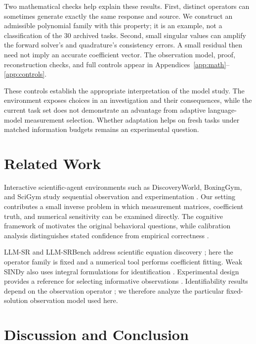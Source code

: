 \documentclass{article}
\begin{document}
Two mathematical checks help explain these results. First, distinct operators
can sometimes generate exactly the same response and source. We construct an
admissible polynomial family with this property; it is an example, not a
classification of the 30 archived tasks. Second, small singular values can
amplify the forward solver's and quadrature's consistency errors. A small
residual then need not imply an accurate coefficient vector. The observation
model, proof, reconstruction checks, and full controls appear in
Appendices~\ref{app:math}--\ref{app:controls}.

These controls establish the appropriate interpretation of the model study.
The environment exposes choices in an investigation and their consequences,
while the current task set does not demonstrate an advantage from adaptive
language-model measurement selection. Whether adaptation helps on fresh tasks
under matched information budgets remains an experimental question.

\section{Related Work}

Interactive scientific-agent environments such as DiscoveryWorld, BoxingGym,
and SciGym study sequential observation and experimentation
\citep{jansen2024discoveryworld,gandhi2025boxinggym,duan2025scigym}.
Our setting contributes a small inverse problem in which measurement matrices,
coefficient truth, and numerical sensitivity can be examined directly.
The cognitive framework of \citet{burnell2026cognitive} motivates the original
behavioral questions, while calibration analysis distinguishes stated
confidence from empirical correctness \citep{guo2017calibration}.

LLM-SR and LLM-SRBench address scientific equation discovery
\citep{shojaee2025llmsr,shojaee2025llmsrbench}; here the operator family is fixed
and a numerical tool performs coefficient fitting. Weak SINDy also uses
integral formulations for identification \citep{messenger2021wsindy}.
Experimental design provides a reference for selecting informative observations
\citep{mackay1992information,alexanderian2021oed}. Identifiability results depend
on the observation operator \citep{egger2014simultaneous,browning2024structural,browning2025parabolic};
we therefore analyze the particular fixed-solution observation model used here.

\section{Discussion and Conclusion}
\end{document}
